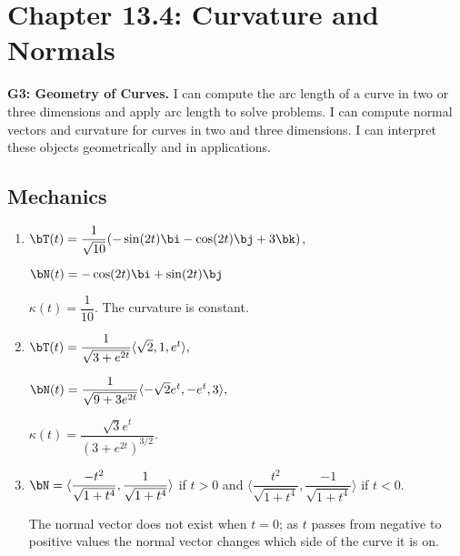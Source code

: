 
\fancyhead[R]{\daysix}

\section*{\centering Chapter 13.4: Curvature and Normals}

\textbf{G3: Geometry of Curves.} I can compute the arc length of a curve in two or three dimensions and apply arc length to solve problems. I can compute normal vectors and curvature for curves in two and three dimensions.  I can interpret these objects geometrically and in applications.

\vspace{-.5cm}

\subsection*{Mechanics}
\begin{enumerate}	
	
	\item {}
    { %
    $\bT(t)=\dfrac{1}{\sqrt{10}}(-\sin(2t)\bi-\cos(2t)\bj+3\bk)$, 
    
    $\bN(t)=-\cos(2t)\bi+\sin(2t)\bj$

    $\kappa(t)=\dfrac{1}{10}$. The curvature is constant.
    }
    { %
    }

	\item {}
    { %
    $\bT(t) = \dfrac{1}{\sqrt{3 + e^{2t}}}\langle \sqrt{2}, 1, e^t\rangle,$ 

    $\bN(t) = \dfrac{1}{\sqrt{9+3e^{2t}}} \langle -\sqrt{2}e^{t}, -e^{t}, 3 \rangle,$ 

    $\kappa(t) = \dfrac{\sqrt{3}e^t}{(3 + e^{2t})^{3/2}}.$
    }
    { %
    }
	
    \item {}
    { %
        $\bN=\langle \dfrac{-t^2}{\sqrt{1+t^4}}, \dfrac{1}{\sqrt{1+t^4}}\rangle$ if $t>0$ and $\langle \dfrac{t^2}{\sqrt{1+t^4}}, \dfrac{-1}{\sqrt{1+t^4}}\rangle$ if $t<0$.

        The normal vector does not exist when $t=0$; as $t$ passes from negative to positive values the normal vector changes which side of the curve it is on.
    }
    { %
    }
\end{enumerate}

